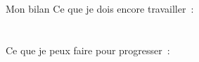 \vfill
\begin{astuce}{Mon bilan}
Ce que je dois encore travailler~:\\[2pt]
\noindent\makebox[\linewidth]{\dotfill}\\[2pt]
\noindent\makebox[\linewidth]{\dotfill}\\[7pt]
Ce que je peux faire pour progresser~:\\[2pt]
\noindent\makebox[\linewidth]{\dotfill}\\[2pt]
\noindent\makebox[\linewidth]{\dotfill}
\end{astuce}

\newpage
{}

\newcommand{\rref}[1]{\textcolor{themeColor}{#1}}

\newcommand{\case}{\raisebox{-0.1ex}{\Large$\square$}}

\newcommand{\oblig}{\tikz[baseline=-0.5ex]{\fill[themeColor] (0,0) circle (0.09);}}
\newcommand{\faclt}{\tikz[baseline=-0.5ex]{\draw[gray!70,line width=0.6pt] (0,0) circle (0.09);}}

